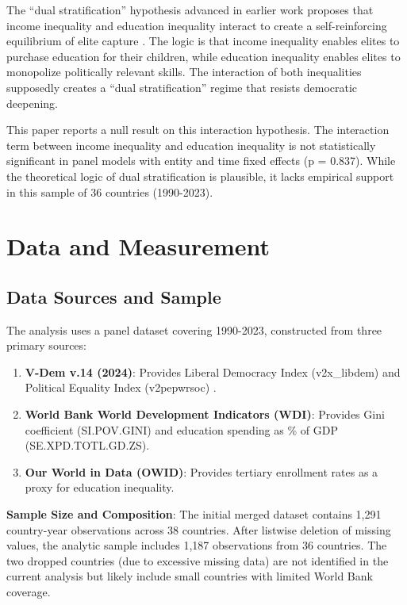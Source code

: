 \documentclass[11pt,letterpaper]{article}
\begin{document}
The ``dual stratification'' hypothesis advanced in earlier work proposes that income inequality and education inequality interact to create a self-reinforcing equilibrium of elite capture \cite{BaliamouneLutz2018}. The logic is that income inequality enables elites to purchase education for their children, while education inequality enables elites to monopolize politically relevant skills. The interaction of both inequalities supposedly creates a ``dual stratification'' regime that resists democratic deepening.

This paper reports a null result on this interaction hypothesis. The interaction term between income inequality and education inequality is not statistically significant in panel models with entity and time fixed effects (p = 0.837). While the theoretical logic of dual stratification is plausible, it lacks empirical support in this sample of 36 countries (1990-2023).

\section{Data and Measurement}

\subsection{Data Sources and Sample}

The analysis uses a panel dataset covering 1990-2023, constructed from three primary sources:

\begin{enumerate}
  \item \textbf{V-Dem v.14 (2024)}: Provides Liberal Democracy Index (v2x\_libdem) and Political Equality Index (v2pepwrsoc) \cite{Coppedge2011}.
  \item \textbf{World Bank World Development Indicators (WDI)}: Provides Gini coefficient (SI.POV.GINI) and education spending as \% of GDP (SE.XPD.TOTL.GD.ZS).
  \item \textbf{Our World in Data (OWID)}: Provides tertiary enrollment rates as a proxy for education inequality.
\end{enumerate}

\textbf{Sample Size and Composition}: The initial merged dataset contains 1,291 country-year observations across 38 countries. After listwise deletion of missing values, the analytic sample includes 1,187 observations from 36 countries. The two dropped countries (due to excessive missing data) are not identified in the current analysis but likely include small countries with limited World Bank coverage.
\end{document}
